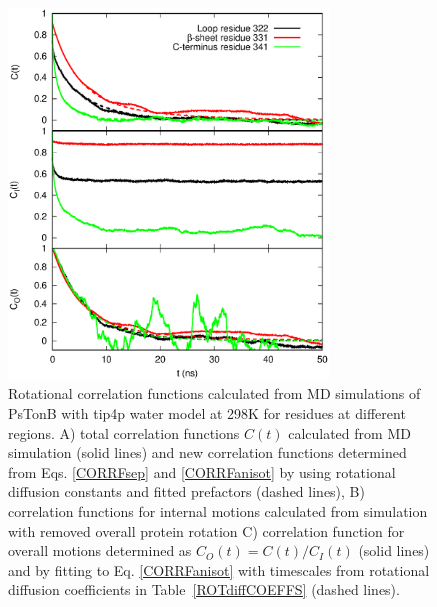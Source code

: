 \documentclass[pre,aps,floatfix,authordate1-4,twocolumn]{revtex4-1}
\begin{document}
\begin{figure}[!h]
  \includegraphics[width=8.5cm]{../Figs/exampleCORRF2.eps}%
  \caption{Rotational correlation functions calculated from MD simulations of PsTonB with tip4p water
    model at 298K for residues at different regions.
    A) total correlation functions $C(t)$ calculated from MD simulation (solid lines) and
    new correlation functions determined from Eqs. \ref{CORRFsep} and \ref{CORRFanisot} by
    using rotational diffusion constants and fitted prefactors (dashed lines),
    B) correlation functions for internal motions calculated from simulation with removed overall protein rotation
    C) correlation function for overall motions determined as $C_O(t)=C(t)/C_I(t)$ (solid lines) and by fitting
    to Eq. \ref{CORRFanisot} with timescales from rotational diffusion coefficients in Table~\ref{ROTdiffCOEFFS} (dashed lines).
    }\label{exampleCORRF}
\end{figure}
\end{document}

